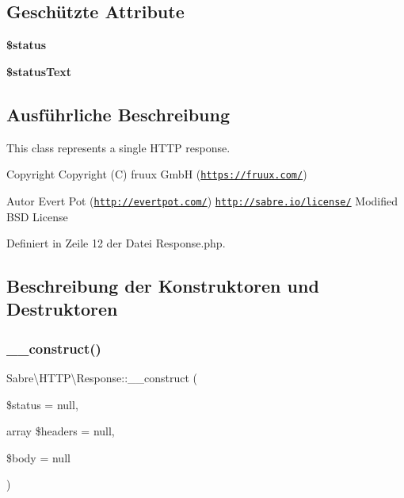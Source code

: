 \subsection*{Geschützte Attribute}
\begin{DoxyCompactItemize}
\item 
\mbox{\label{class_sabre_1_1_h_t_t_p_1_1_response_a6eb084c415f2f75fe5bfd7f802c66f10}} 
{\bfseries \$status}
\item 
\mbox{\label{class_sabre_1_1_h_t_t_p_1_1_response_a8e330496979f2c00e5d17d204ef9dcd8}} 
{\bfseries \$status\+Text}
\end{DoxyCompactItemize}


\subsection{Ausführliche Beschreibung}
This class represents a single H\+T\+TP response.

\begin{DoxyCopyright}{Copyright}
Copyright (C) fruux GmbH (\href{https://fruux.com/}{\tt https\+://fruux.\+com/}) 
\end{DoxyCopyright}
\begin{DoxyAuthor}{Autor}
Evert Pot (\href{http://evertpot.com/}{\tt http\+://evertpot.\+com/})  \href{http://sabre.io/license/}{\tt http\+://sabre.\+io/license/} Modified B\+SD License 
\end{DoxyAuthor}


Definiert in Zeile 12 der Datei Response.\+php.



\subsection{Beschreibung der Konstruktoren und Destruktoren}
\mbox{\label{class_sabre_1_1_h_t_t_p_1_1_response_ab63feaf0e0ae3fb2bed0439a1c556777}} 
\subsubsection{\texorpdfstring{\+\_\+\+\_\+construct()}{\_\_construct()}}
{\footnotesize\ttfamily Sabre\textbackslash{}\+H\+T\+T\+P\textbackslash{}\+Response\+::\+\_\+\+\_\+construct (\begin{DoxyParamCaption}\item[{}]{\$status = {\ttfamily null},  }\item[{array}]{\$headers = {\ttfamily null},  }\item[{}]{\$body = {\ttfamily null} }\end{DoxyParamCaption})}

